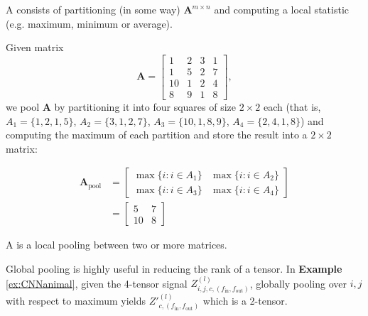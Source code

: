 \begin{definition}
    A  consists of partitioning (in some way) $\textbf{A}^{m \times n}$ and computing a local statistic (e.g. maximum, minimum or average).
\end{definition}

\begin{example}
    Given matrix
    $$\textbf{A} = 
    \begin{bmatrix}
        1& 2& 3 &1\\
        1 &5&2 &7 \\
        10& 1& 2& 4\\
        8& 9& 1 &8
    \end{bmatrix},
    $$we pool $\textbf{A}$ by partitioning it into four squares of size $2 \times 2$ each (that is, $A_{1} = \{1,2, 1,5 \}$, $A_{2} = \{ 3,1,2,7\}$, $A_{3} = \{ 10,1,8,9\}$, $A_{4} = \{ 2,4,1,8\}$) and computing the maximum of each partition and store the result into a $2 \times 2$ matrix:
    \begin{ceqn}
        \begin{align*}
            \textbf{A}_{\text{pool}} &= \begin{bmatrix} \max\{ i : i \in A_{1}\} & \max\{ i : i \in A_{2}\} \\
            \max\{ i : i \in A_{3}\} & \max\{ i : i \in A_{4}\}
            \end{bmatrix}\\
            & =
            \begin{bmatrix}
                5 & 7 \\
                10 & 8
            \end{bmatrix}
        \end{align*}
    \end{ceqn}
\end{example}

\begin{definition}
    A  is a local pooling between two or more matrices.
\end{definition}
\begin{example}
    Global pooling is highly useful in reducing the rank of a tensor. In \textbf{Example} \ref{ex:CNNanimal}, given the 4-tensor signal $Z^{(l)}_{i,j,c,(f_{\text{in}},f_{\text{out}})}$, globally pooling over $i,j$ with respect to maximum yields $Z'^{(l)}_{c,(f_{\text{in}},f_{\text{out}})}$ which is a 2-tensor.
\end{example}

